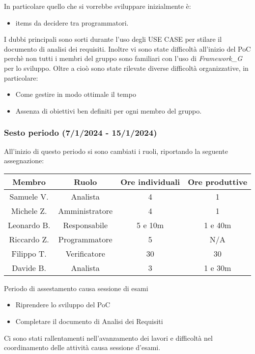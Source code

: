 In particolare quello che si vorrebbe sviluppare inizialmente è: 
\begin{itemize}
    \item items da decidere tra programmatori.
\end{itemize}


I dubbi principali sono sorti durante l'uso degli USE CASE per stilare il documento di analisi dei requisiti. Inoltre vi sono state difficoltà all'inizio del PoC perchè non tutti i membri del gruppo sono familiari con l'uso di \textit{Framework_G} per lo sviluppo.
Oltre a cioò sono state rilevate diverse difficoltà organizzative, in particolare:
\begin{itemize}
    \item Come gestire in modo ottimale il tempo
    \item Assenza di obiettivi ben definiti per ogni membro del gruppo.
\end{itemize}

\subsubsection{Sesto periodo (7/1/2024 - 15/1/2024)}
All'inizio di questo periodo si sono cambiati i ruoli, riportando la seguente assegnazione:

\vspace{10 mm}
\begin{tabular}{|c|c|c|c|}
\hline
\textbf{Membro} & \textbf{Ruolo} & \textbf{Ore individuali} & \textbf{Ore produttive} \\
\hline
Samuele V. & Analista & 4 & 1 \\
\hline
Michele Z. & Amministratore & 4 & 1 \\
\hline
Leonardo B. & Responsabile & 5 e 10m & 1 e 40m \\
\hline
Riccardo Z. & Programmatore & 5 & N/A \\
\hline
Filippo T. & Verificatore & 30 & 30 \\
\hline
Davide B. & Analista & 3 & 1 e 30m \\
\hline
\end{tabular}
\vspace{10 mm}

Periodo di assestamento causa sessione di esami
\begin{itemize}
    \item Riprendere lo sviluppo del PoC
    \item Completare il documento di Analisi dei Requisiti
\end{itemize}
Ci sono stati rallentamenti nell'avanzamento dei lavori e difficoltà nel coordinamento delle attività causa sessione d'esami.


